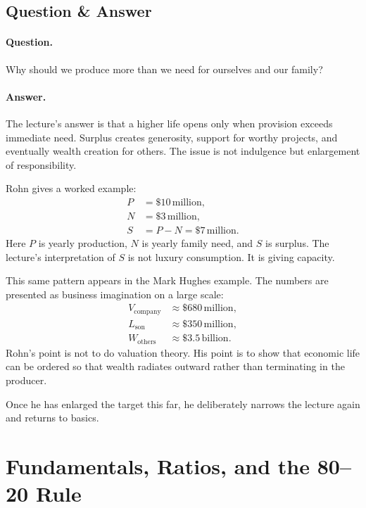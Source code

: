 \subsection{Question \& Answer}

\paragraph{Question.} Why should we produce more than we need for ourselves and our family?

\paragraph{Answer.} The lecture's answer is that a higher life opens only when provision exceeds immediate need. Surplus creates generosity, support for worthy projects, and eventually wealth creation for others. The issue is not indulgence but enlargement of responsibility.

Rohn gives a worked example:
\begin{align}
P &= \$10\,\text{million}, \\
N &= \$3\,\text{million}, \\
S &= P-N = \$7\,\text{million}.
\end{align}
Here \(P\) is yearly production, \(N\) is yearly family need, and \(S\) is surplus. The lecture's interpretation of \(S\) is not luxury consumption. It is giving capacity.

This same pattern appears in the Mark Hughes example. The numbers are presented as business imagination on a large scale:
\begin{align}
V_{\mathrm{company}} &\approx \$680\,\text{million}, \\
L_{\mathrm{son}} &\approx \$350\,\text{million}, \\
W_{\mathrm{others}} &\approx \$3.5\,\text{billion}.
\end{align}
Rohn's point is not to do valuation theory. His point is to show that economic life can be ordered so that wealth radiates outward rather than terminating in the producer.

Once he has enlarged the target this far, he deliberately narrows the lecture again and returns to basics.

\section{Fundamentals, Ratios, and the 80--20 Rule}

